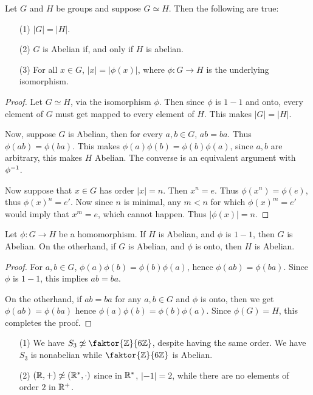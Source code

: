 \begin{lemma}\label{lemma_1.5.3}
  Let $G$ and  $H$ be groups and suppose  $G \simeq H$. Then the following are
  true:
  \begin{enumerate}
    \item[(1)] $|G|=|H|$.

    \item[(2)] $G$ is Abelian if, and only if  $H$ is abelian.

    \item[(3)] For all $x \in G$, $|x|=|\phi(x)|$, where $\phi:G
      \xrightarrow{} H$ is the underlying isomorphism.
  \end{enumerate}
\end{lemma}
\begin{proof}
  Let $G \simeq H$,  via the isomorphism  $\phi$. Then since $\phi$ is  $1-1$
  and onto, every element of  $G$ must get mapped to every element of  $H$.
  This makes $|G|=|H|$.

  Now, suppose $G$ is Abelian, then for every  $a, b \in G$,  $ab=ba$. Thus
  $\phi(ab)=\phi(ba)$. This makes $\phi(a)\phi(b)=\phi(b)\phi(a)$, since $a,b$
  are arbitrary, this makes  $H$ Abelian. The converse is an equivalent
  argument with  $\phi^{-1}$.

  Now suppose that $x \in G$ has order  $|x|=n$. Then $x^n=e$. Thus
  $\phi(x^n)=\phi(e)$, thus $\phi(x)^n=e'$. Now since $n$ is minimal, any
  $m<n$ for which  $\phi(x)^m=e'$ would imply that $x^m=e$, which cannot
  happen. Thus  $|\phi(x)|=n$.
\end{proof}
\begin{corollary}
  Let $\phi:G \rightarrow H$ be a homomorphism. If $H$ is Abelian, and  $\phi$
  is  $1-1$, then  $G$ is Abelian. On the otherhand, if  $G$ is Abelian, and
  $\phi$ is onto, then  $H$ is Abelian.
\end{corollary}
\begin{proof}
  For $a,b \in G$,  $\phi(a)\phi(b)=\phi(b)\phi(a)$, hence
  $\phi(ab)=\phi(ba)$. Since $\phi$ is  $1-1$, this implies  $ab=ba$.

  On the otherhand, if $ab=ba$ for any  $a,b \in G$ and  $\phi$ is onto, then
  we get  $\phi(ab)=\phi(ba)$ hence $\phi(a)\phi(b)=\phi(b)\phi(a)$. Since
  $\phi(G)=H$, this completes the proof.
\end{proof}

\begin{example}\label{example_1.13}
  \begin{enumerate}
    \item[(1)] We have $S_3 \not\simeq \faktor{\Z}{6\Z}$, despite having the
      same order. We have $S_3$ is nonabelian while  $\faktor{\Z}{6\Z}$ is
      Abelian.

    \item[(2)] $(\mathbb{R},+) \not\simeq (\mathbb{R}^*, \cdot)$ since in $\mathbb{R}^*$,
      $|-1|=2$, while there are no elements of order $2$ in  $\mathbb{R}^+$.
  \end{enumerate}
\end{example}

